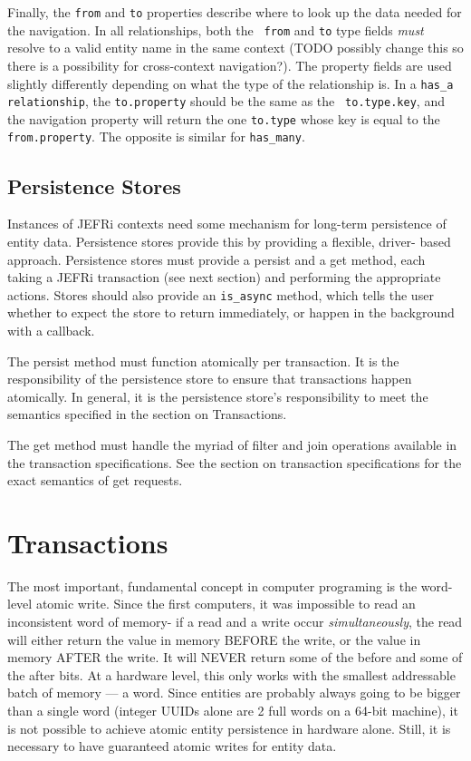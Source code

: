 \documentclass{article}
\newcommand{\ilcode}{\tt}
\begin{document}
Finally, the {\ilcode from} and {\ilcode to} properties describe where to look
up the data needed for the navigation. In all relationships, both the {\ilcode
from} and {\ilcode to} type fields {\it must} resolve to a valid entity name in
the same context (TODO possibly change this so there is a possibility for
cross-context navigation?). The property fields are used slightly differently
depending on what the type of the relationship is. In a {\ilcode has\_a
relationship}, the {\ilcode to.property} should be the same as the {\ilcode
to.type.key}, and the navigation property will return the one {\ilcode to.type}
whose key is equal to the {\ilcode from.property}. The opposite is similar for
{\ilcode has\_many}.

\subsection{Persistence Stores}

Instances of JEFRi contexts need some mechanism for long-term persistence of
entity data. Persistence stores provide this by providing a flexible, driver-
based approach. Persistence stores must provide a persist and a get method, each
taking a JEFRi transaction (see next section) and performing the appropriate
actions. Stores should also provide an {\ilcode is\_async} method, which tells
the user whether to expect the store to return immediately, or happen in the
background with a callback.

The persist method must function atomically per transaction. It is the
responsibility of the persistence store to ensure that transactions happen
atomically. In general, it is the persistence store's responsibility to meet the
semantics specified in the section on Transactions.

The get method must handle the myriad of filter and join operations available in
the transaction specifications. See the section on transaction specifications
for the exact semantics of get requests.

\section{Transactions}

The most important, fundamental concept in computer programing is the word-level
atomic write. Since the first computers, it was impossible to read an
inconsistent word of memory- if a read and a write occur {\sl simultaneously},
the read will either return the value in memory BEFORE the write, or the value
in memory AFTER the write. It will NEVER return some of the before and some of
the after bits. At a hardware level, this only works with the smallest
addressable batch of memory --- a word. Since entities are probably always going
to be bigger than a single word (integer UUIDs alone are 2 full words on a 64-bit
machine), it is not possible to achieve atomic entity persistence in hardware
alone. Still, it is necessary to have guaranteed atomic writes for entity data.
\end{document}
